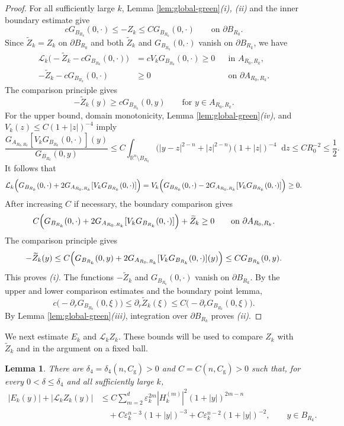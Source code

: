 \documentclass[11pt]{article}
\numberwithin{equation}{section}
\newtheorem{lemma}[theorem]{Lemma}
\theoremstyle{remark}
\newcommand{\R}{\mathbb R}
\newcommand{\dd}{\mathop{}\!\mathrm{d}}
\begin{document}
\begin{proof}
 For all sufficiently large $k$, Lemma  \ref{lem:global-green}\emph{(i),
(ii)} and the inner boundary estimate give
{
\[
 cG_{B_{R_k}}(0,\cdot)
 \le -Z_k
 \le CG_{B_{R_k}}(0,\cdot)
 \qquad\text{on }\partial B_{R_0}.
\]
}
Since $\widetilde Z_k=Z_k$ on $\partial B_{R_0}$ and
both $\widetilde Z_k$ and $G_{B_{R_k}}(0,\cdot)$ vanish on
$\partial B_{R_k}$, we have
{
\[
\begin{aligned}
  \mathcal L_k\bigl(-\widetilde Z_k-cG_{B_{R_k}}(0,\cdot)\bigr)
 &=cV_kG_{B_{R_k}}(0,\cdot)\ge0
 &&\text{in }A_{R_0,R_k}, \\
 -\widetilde Z_k-cG_{B_{R_k}}(0,\cdot)&\ge0
 &&\text{on }\partial A_{R_0,R_k}.
\end{aligned}
\]
}
The comparison principle gives
{
\[
 -\widetilde Z_k(y)\ge cG_{B_{R_k}}(0,y)
 \qquad\text{for }y\in A_{R_0,R_k}.
\]
}
For the upper bound, domain monotonicity, Lemma  \ref{lem:global-green}\emph{(iv)},
and $V_k(z)\le C(1+|z|)^{-4}$ imply
{
\[
 \frac{G_{A_{R_0,R_k}}[V_kG_{B_{R_k}}(0,\cdot)](y)}
 {G_{B_{R_k}}(0,y)}
 \le C\int_{\R^n\setminus B_{R_0}}
 \bigl(|y-z|^{2-n}+|z|^{2-n}\bigr)(1+|z|)^{-4}\dd z
 \le CR_0^{-2}\le\frac12.
\]
}
It follows that
{
\[
 \mathcal L_k\Bigl(G_{B_{R_k}}(0,\cdot)
 +2G_{A_{R_0,R_k}}[V_kG_{B_{R_k}}(0,\cdot)]\Bigr)
 =V_k\Bigl(G_{B_{R_k}}(0,\cdot)
 -2G_{A_{R_0,R_k}}[V_kG_{B_{R_k}}(0,\cdot)]\Bigr)\ge0.
\]
}
After increasing $C$ if necessary, the boundary comparison gives
{
\[
 C\Bigl(G_{B_{R_k}}(0,\cdot)
 +2G_{A_{R_0,R_k}}[V_kG_{B_{R_k}}(0,\cdot)]\Bigr)
 +\widetilde Z_k\ge0
 \qquad\text{on }\partial A_{R_0,R_k}.
\]
}
The comparison principle gives
{
\[
 -\widetilde Z_k(y)
 \le C\Bigl(G_{B_{R_k}}(0,y)
 +2G_{A_{R_0,R_k}}[V_kG_{B_{R_k}}(0,\cdot)](y)\Bigr)
 \le CG_{B_{R_k}}(0,y).
\]
}
This proves \emph{(i)}.
The functions $-\widetilde Z_k$ and $G_{B_{R_k}}(0,\cdot)$ vanish on
$\partial B_{R_k}$.  By the upper and lower comparison estimates and the  boundary point
lemma,
{
\[
 c\bigl(-\partial_rG_{B_{R_k}}(0,\xi)\bigr)
 \le\partial_r\widetilde Z_k(\xi)
 \le C\bigl(-\partial_rG_{B_{R_k}}(0,\xi)\bigr).
\]
}
 By Lemma  \ref{lem:global-green}\emph{(iii)}, integration over
$\partial B_{R_k}$ proves \emph{(ii)}.
\end{proof}

 We next estimate $E_k$ and $\mathcal L_kZ_k$.  These bounds will be used to
compare $Z_k$ with $\widetilde Z_k$ and in the argument on a fixed ball.
\begin{lemma} \label{lem:profile-error-estimate}
There are $\delta_4=\delta_4(n,C_{\mathrm g})>0$ and
$C=C(n,C_{\mathrm g})>0$ such that, for every $0<\delta\le\delta_4$ and all
sufficiently large $k$,
 {
\begin{equation}\label{eq:pointwise-profile-error}
\begin{aligned}
 |E_k(y)|+|\mathcal L_kZ_k(y)|
 &\le C\sum_{m=2}^d\varepsilon_k^{2m}|H_k^{(m)}|^2
       (1+|y|)^{2m-n}\\
 &\quad+C\varepsilon_k^{n-3}(1+|y|)^{-3}
  +C\varepsilon_k^{n-2}(1+|y|)^{-2},
 \qquad y\in B_{R_k}.
\end{aligned}
\end{equation}
}
 \end{lemma}
\end{document}

